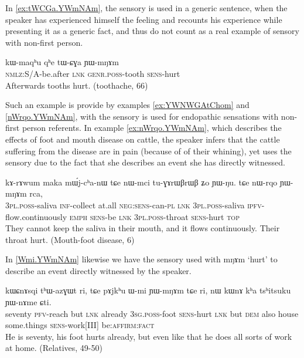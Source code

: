 \documentclass[oldfontcommands,oneside,a4paper,11pt]{article}
\newcommand{\ipa}[1]{{\phon \mbox{#1}}} %
\newcommand{\factual}[1]{\textsc{:fact}}
\begin{document}
In \ref{ex:tWCGa.YWmNAm}, the sensory is used in a generic sentence, when the speaker has experienced himself the feeling and recounts his experience while presenting it as a generic fact, and thus do not count as a real example of sensory with non-first person.

\begin{exe}
\ex \label{ex:tWCGa.YWmNAm}
\gll
\ipa{kɯ-maqʰu}  	\ipa{qʰe}  	\ipa{tɯ-ɕɣa}  	\ipa{ɲɯ-mŋɤm}  \\
\textsc{nmlz}:S/A-be.after \textsc{lnk} \textsc{genr.poss}-tooth \textsc{sens}-hurt \\
\glt Afterwards tooths hurt. (toothache, 66)
\end{exe}

Such an example is provide by examples \ref{ex:YWNWGAtChom} and \ref{nWrqo.YWmNAm},  with the sensory is used for endopathic sensations with non-first person referents. In example \ref{ex:nWrqo.YWmNAm}, which describes the effects of foot and mouth disease on cattle, the speaker  infers that the cattle suffering from the disease are in pain (because of of their whining), yet uses the sensory due to the fact that she describes an event she has directly witnessed. 

\begin{exe}
\ex \label{ex:nWrqo.YWmNAm}
\gll \ipa{nɯ-mci} 	\ipa{kɤ-rɤwum} 	\ipa{maka} 	\ipa{mɯ́j-cʰa-nɯ} 	\ipa{tɕe} 	\ipa{nɯ-mci} 	\ipa{tu-ɣɤrɯβrɯβ} 	\ipa{ʑo} 	\ipa{ɲɯ-ŋu.}  
\ipa{tɕe} 	\ipa{nɯ-rqo} 	\ipa{ɲɯ-mŋɤm} 	\ipa{rca,} \\
\textsc{3pl.poss}-saliva \textsc{inf}-collect at.all \textsc{neg:sens}-can-\textsc{pl} \textsc{lnk} \textsc{3pl.poss}-saliva \textsc{ipfv}-flow.continuously \textsc{emph} \textsc{sens}-be \textsc{lnk} \textsc{3pl.poss}-throat \textsc{sens}-hurt \textsc{top}  \\
\glt They cannot keep the saliva in their mouth, and it flows continuously. Their throat hurt. (Mouth-foot disease, 6)
\end{exe}

In \ref{Wmi.YWmNAm} likewise we have the sensory used with \ipa{mŋɤm} `hurt' to describe an event directly witnessed by the speaker.

\begin{exe}
\ex \label{Wmi.YWmNAm}
\gll
\ipa{kɯɕnɤsqi} 	\ipa{tʰɯ-azɣɯt} 	\ipa{ri,} \ipa{tɕe} 	\ipa{pɤjkʰu} 	\ipa{ɯ-mi} 	\ipa{ɲɯ-mŋɤm} 	\ipa{tɕe} 	\ipa{ri,} 	\ipa{nɯ} 	\ipa{kɯnɤ} 	\ipa{kʰa} 	\ipa{tsʰitsuku} 	\ipa{ɲɯ-nɤme} 	\ipa{ɕti.} \\
seventy \textsc{pfv}-reach but \textsc{lnk} already \textsc{3sg.poss}-foot \textsc{sens}-hurt \textsc{lnk} but \textsc{dem} also house some.things \textsc{sens}-work[III] be:\textsc{affirm}\factual{} \\
\glt He is seventy, his foot hurts already, but even like that he does all sorts of work at home. (Relatives, 49-50)
\end{exe}
\end{document}
